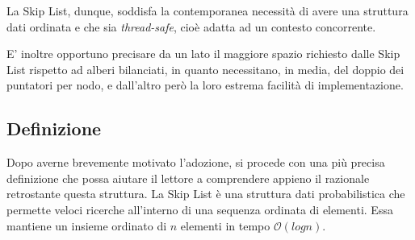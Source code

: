 	La Skip List, dunque, soddisfa la contemporanea necessità di avere una struttura dati ordinata e che sia \textit{thread-safe}, cioè adatta ad un contesto concorrente.
	
	E' inoltre opportuno precisare da un lato il maggiore spazio richiesto dalle Skip List rispetto ad alberi bilanciati, in quanto necessitano, in media, del doppio dei puntatori per nodo, e dall'altro però la loro estrema facilità di implementazione.
	
	\subsection{Definizione}\label{terminologia}
	


	Dopo averne brevemente motivato l'adozione, si procede con una più precisa definizione che possa aiutare il lettore a comprendere appieno il razionale retrostante questa struttura. 
	La Skip List è una struttura dati probabilistica che permette veloci ricerche all'interno di una sequenza ordinata di elementi. Essa mantiene un insieme ordinato di $ n $ elementi in tempo $\mathcal{O}(log{}n)$.
	
